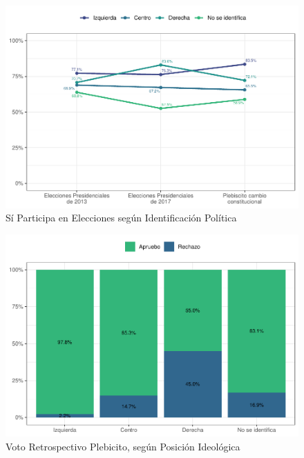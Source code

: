 \documentclass[
  12pt,
  openany]{book}
\begin{document}
\begin{figure}

{\centering \includegraphics{reporte-elsoc_files/figure-latex/particip-elect-id-1} 

}

\caption{Sí Participa en Elecciones según Identificación Política}\label{fig:particip-elect-id}
\end{figure}

\begin{figure}

{\centering \includegraphics{reporte-elsoc_files/figure-latex/id-pol-voto-1} 

}

\caption{Voto Retrospectivo Plebicito, según Posición Ideológica}\label{fig:id-pol-voto}
\end{figure}
\end{document}
